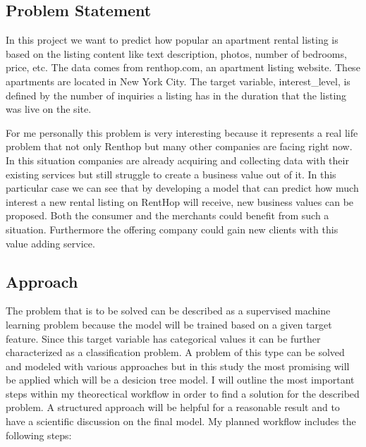 \documentclass[runningheads]{llncs}
\begin{document}
    \subsection{Problem Statement}
In this project we want to predict how popular an apartment rental listing is based on the listing content like text description, photos, number of bedrooms, price, etc. The data comes from renthop.com, an apartment listing website. These apartments are located in New York City.
The target variable, interest\_level, is defined by the number of inquiries a listing has in the duration that the listing was live on the site. 

For me personally this problem is very interesting because it represents a real life problem that not only Renthop but many other companies are facing right now. In this situation companies are already acquiring and collecting data with their existing services but still struggle to create a business value out of it. In this particular case we can see that by developing a model that can predict how much interest a new rental listing on RentHop will receive, new business values can be proposed. Both the consumer and the merchants could benefit from such a situation. Furthermore the offering company could gain new clients with this value adding service.
\newline

\subsection{Approach}
The problem that is to be solved can be described as a supervised machine learning problem because the model will be trained based on a given target feature. Since this target variable has categorical values it can be further characterized as a classification problem. A problem of this type can be solved and modeled with various approaches but in this study the most promising will be applied which will be a desicion tree model.
\newline
I will outline the most important steps within my theorectical workflow in order to find a solution for the described problem. A structured approach will be helpful for a reasonable result and to have a scientific discussion on the final model. My planned workflow includes the following steps:
\end{document}
